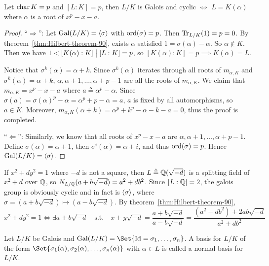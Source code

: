 \begin{coro}
  Let $\operatorname{char} K = p$ and $[L: K] = p$, then $L/K$ is Galois and cyclic $\iff$ $L = K(\alpha)$ where
  $\alpha$ is a root of $x^p - x - a$.

  \begin{proof}
    ``$\Rightarrow$'': Let $\operatorname{Gal}(L/K) = \langle\sigma\rangle$ with $\operatorname{ord}(\sigma) = p$. Then
    $\operatorname{Tr}_{L/K}(1) = p = 0$. By theorem~\ref{thm:Hilbert-theorem-90},
    exists $\alpha$ satisfied $1 = \sigma(\alpha) - \alpha$.
    So $\alpha \not\in K$. Then we have $1 < [K(\alpha): K] \bigm| [L: K] = p$,
    so $[K(\alpha): K] = p \implies K(\alpha) = L$.

    Notice that $\sigma^k(\alpha) = \alpha + k$.
    Since $\sigma^k(\alpha)$ iterates through all roots of $m_{\alpha, K}$ and $\sigma^k(\alpha) = \alpha + k$,
    $\alpha, \alpha+1, \dots, \alpha +p-1$ are all the roots of $m_{\alpha, K}$.
    We claim that $m_{\alpha, K} = x^p - x - a$ where $a \triangleq \alpha^p - \alpha$.
    Since $\sigma(a) = \sigma(\alpha)^p - \alpha = \alpha^p + p - \alpha = a$,
    $a$ is fixed by all automorphisms, so $a \in K$. Moreover, $m_{\alpha, K}(\alpha+k)
    = \alpha^p + k^p - \alpha - k - a = 0$, thus the proof is completed.

    ``$\Leftarrow$'': Similarly, we know that all roots of $x^p - x - a$
    are $\alpha, \alpha+1, \dots, \alpha+{p-1}$. Define $\sigma(\alpha) = \alpha+1$,
    then $\sigma^i(\alpha) = \alpha+i$, and thus $\operatorname{ord}(\sigma) = p$. Hence $\operatorname{Gal}(L/K) = \langle\sigma\rangle$.
  \end{proof}
\end{coro}

\begin{coro}
  If $x^2 + d y^2 = 1$ where $-d$ is not a square, then $L \triangleq \mathbb{Q}(\sqrt{-d})$
  is a splitting field of $x^2 + d$ over $\mathbb{Q}$,
  so $N_{L/\mathbb{Q}}(a + b \sqrt{-d}) = a^2 + d b^2$. Since $[L: \mathbb{Q}] = 2$,
  the galois group is obviously cyclic and in fact is $\langle\sigma\rangle$,
  where $\sigma = (a + b \sqrt{-d}) \mapsto (a - b \sqrt{-d})$.
  By theorem~\ref{thm:Hilbert-theorem-90},
  \[ x^2 + d y^2 = 1 \iff \exists a + b \sqrt{-d} \quad\text{s.t.}\quad x + y \sqrt{-d} = \frac{a+b\sqrt{-d}}{a-b\sqrt{-d}}
    = \frac{(a^2 - db^2) + 2ab\sqrt{-d}}{a^2 + db^2} \]
\end{coro}

\begin{definition}
  Let $L/K$ be Galois and $\Gal(L/K) = \Set{ \text{Id} = \sigma_1, \dots, \sigma_n }$.
  A basis for $L/K$ of the form $\Set{ \sigma_1(\alpha), \sigma_2(\alpha), \dots, \sigma_n(\alpha)}$
  with $\alpha \in L$ is called  a normal basis for $L/K$.
\end{definition}

